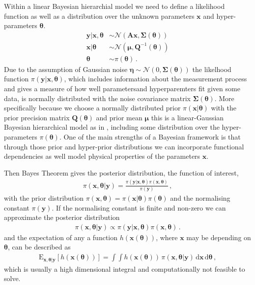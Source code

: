 Within a linear Bayesian hierarchial model we need to define a likelihood function as well as a distribution over the unknown parameters $\bm{x}$ and hyper-parameters $\bm{\theta}$.
\begin{subequations}
	\begin{align}
		\bm{y}|\bm{x}, \bm{\theta}&\sim \mathcal{N}(\bm{A} \bm{x}, \bm{\Sigma}(\bm{\theta})) \label{eq:likelihood}  \\
		\bm{x}| \bm{\theta} & \sim  \mathcal{N}( \bm{\mu}, \bm{Q}^{-1}(\bm{\theta})  ) \label{eq:xPrior} \\
		\bm{\theta} &\sim  \pi(\bm{\theta}) \label{eq:gammaPrior}\, .
	\end{align}
	\label{eq:BayMode}
\end{subequations}
Due to the assumption of Gaussian noise $\bm{\eta} \sim \mathcal{N}(0, \bm{\Sigma}(\bm{\theta})) $ the likelhood function $\pi(\bm{y}|\bm{x}, \bm{\theta})$, which includes information about the measurement process and gives a measure of how well parametersand  hyperparemters fit given some data, is normally distributed with the noise covariance matrix $\bm{\Sigma}(\bm{\theta})$. 
More specifically because we choose a normally distributed prior $\pi(\bm{x}| \bm{\theta})$ with the prior precision matrix $\bm{Q}(\bm{\theta})$ and prior mean $\bm{\mu}$ this is a linear-Gaussian Bayesian hierarchical model as in \cite{fox2016fast}, including some distribution over the hyper-parameters $\pi(\bm{\theta})$.
One of the main strengths of a Bayesian framework is that through those prior and hyper-prior distributions we can incorporate functional dependencies as well model physical properties of the parameters $\bm{x}$. 

Then Bayes Theorem gives the posterior distribution, the function of interest,
\begin{align}
	\pi(\bm{x},\bm{\theta}|\bm{y}) = \frac{ \pi(\bm{y} | \bm{x}, \bm{\theta} ) \pi(\bm{x}, \bm{\theta})}{\pi(\bm{y})} \, ,
\end{align}
with the prior distribution $\pi(\bm{x}, \bm{\theta}) = \pi(\bm{x}| \bm{\theta}) \pi(\bm{\theta}) $ and the normalising constant $\pi(\bm{y})$.
If the normalising constant is finite and non-zero we can approximate the posterior distribution
\begin{align}
	\pi(\bm{x},\bm{\theta}|\bm{y}) \propto \pi(\bm{y} | \bm{x}, \bm{\theta} ) \pi(\bm{x}, \bm{\theta}) \, .
\end{align}
and the expectation of any a function $h(\bm{x}(\bm{\theta}))$, where $\bm{x}$ may be depending on $\bm{\theta}$, can be described as 
\begin{align}
	\text{E}_{\bm{x},\bm{\theta}|\bm{y}} [h(\bm{x}(\bm{\theta}))] =  \int \int   h(\bm{x}(\bm{\theta})) \,  \pi(\bm{x}, \bm{\theta} | \bm{y} ) \, \text{d} \bm{x}  \, \text{d} \bm{\theta}   \label{eq:expPos} \, ,
\end{align}
which is usually a high dimensional integral and computationally not feasible to solve.


